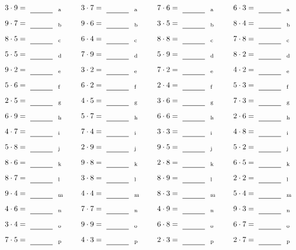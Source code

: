 \documentclass
[
  draft    = true,
  fontsize = 11pt,
  parskip  = half-
]
{scrartcl}
\begin{document}
\par\vfill\par
\begin{align*}
    \pline{3\cdot9}&=\rline{a}
  & \pline{3\cdot7}&=\rline{a}
  & \pline{7\cdot6}&=\rline{a}
  & \pline{6\cdot3}&=\rline{a} \\[1ex]
    \pline{9\cdot7}&=\rline{b}
  & \pline{9\cdot6}&=\rline{b}
  & \pline{3\cdot5}&=\rline{b}
  & \pline{8\cdot4}&=\rline{b} \\[1ex]
    \pline{8\cdot5}&=\rline{c}
  & \pline{6\cdot4}&=\rline{c}
  & \pline{8\cdot8}&=\rline{c}
  & \pline{7\cdot8}&=\rline{c} \\[1ex]
    \pline{5\cdot5}&=\rline{d}
  & \pline{7\cdot9}&=\rline{d}
  & \pline{5\cdot9}&=\rline{d}
  & \pline{8\cdot2}&=\rline{d} \\[1ex]
    \pline{9\cdot2}&=\rline{e}
  & \pline{3\cdot2}&=\rline{e}
  & \pline{7\cdot2}&=\rline{e}
  & \pline{4\cdot2}&=\rline{e} \\[1ex]
    \pline{5\cdot6}&=\rline{f}
  & \pline{6\cdot2}&=\rline{f}
  & \pline{2\cdot4}&=\rline{f}
  & \pline{5\cdot3}&=\rline{f} \\[1ex]
    \pline{2\cdot5}&=\rline{g}
  & \pline{4\cdot5}&=\rline{g}
  & \pline{3\cdot6}&=\rline{g}
  & \pline{7\cdot3}&=\rline{g} \\[1ex]
    \pline{6\cdot9}&=\rline{h}
  & \pline{5\cdot7}&=\rline{h}
  & \pline{6\cdot6}&=\rline{h}
  & \pline{2\cdot6}&=\rline{h} \\[1ex]
    \pline{4\cdot7}&=\rline{i}
  & \pline{7\cdot4}&=\rline{i}
  & \pline{3\cdot3}&=\rline{i}
  & \pline{4\cdot8}&=\rline{i} \\[1ex]
    \pline{5\cdot8}&=\rline{j}
  & \pline{2\cdot9}&=\rline{j}
  & \pline{9\cdot5}&=\rline{j}
  & \pline{5\cdot2}&=\rline{j} \\[1ex]
    \pline{8\cdot6}&=\rline{k}
  & \pline{9\cdot8}&=\rline{k}
  & \pline{2\cdot8}&=\rline{k}
  & \pline{6\cdot5}&=\rline{k} \\[1ex]
    \pline{8\cdot7}&=\rline{l}
  & \pline{3\cdot8}&=\rline{l}
  & \pline{8\cdot9}&=\rline{l}
  & \pline{2\cdot2}&=\rline{l} \\[1ex]
    \pline{9\cdot4}&=\rline{m}
  & \pline{4\cdot4}&=\rline{m}
  & \pline{8\cdot3}&=\rline{m}
  & \pline{5\cdot4}&=\rline{m} \\[1ex]
    \pline{4\cdot6}&=\rline{n}
  & \pline{7\cdot7}&=\rline{n}
  & \pline{4\cdot9}&=\rline{n}
  & \pline{9\cdot3}&=\rline{n} \\[1ex]
    \pline{3\cdot4}&=\rline{o}
  & \pline{9\cdot9}&=\rline{o}
  & \pline{6\cdot8}&=\rline{o}
  & \pline{6\cdot7}&=\rline{o} \\[1ex]
    \pline{7\cdot5}&=\rline{p}
  & \pline{4\cdot3}&=\rline{p}
  & \pline{2\cdot3}&=\rline{p}
  & \pline{2\cdot7}&=\rline{p}
\end{align*}
\end{document}
